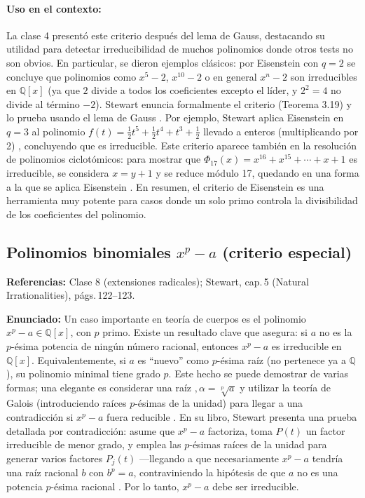\documentclass[12pt, letter]{article}
\begin{document}
\paragraph*{Uso en el contexto:}
La clase 4 presentó este criterio después del lema de Gauss, destacando su utilidad para detectar irreducibilidad de muchos polinomios donde otros tests no son obvios. En particular, se dieron ejemplos clásicos: por Eisenstein con $q=2$ se concluye que polinomios como $x^5 - 2$, $x^{10}-2$ o en general $x^n - 2$ son irreducibles en $\mathbb{Q}[x]$ (ya que $2$ divide a todos los coeficientes excepto el líder, y $2^2=4$ no divide al término $-2$). Stewart enuncia formalmente el criterio (Teorema 3.19) y lo prueba usando el lema de Gauss  . Por ejemplo, Stewart aplica Eisenstein en $q=3$ al polinomio $f(t)=\tfrac{1}{2}t^5+\tfrac{1}{2}t^4+t^3+\tfrac{1}{2}$ llevado a enteros (multiplicando por 2) , concluyendo que es irreducible. Este criterio aparece también en la resolución de polinomios ciclotómicos: para mostrar que $\Phi_{17}(x)=x^{16}+x^{15}+\cdots+x+1$ es irreducible, se considera $x= y+1$ y se reduce módulo 17, quedando en una forma a la que se aplica Eisenstein  . En resumen, el criterio de Eisenstein es una herramienta muy potente para casos donde un solo primo controla la divisibilidad de los coeficientes del polinomio.

\subsection*{Polinomios binomiales $x^p - a$ (criterio especial)}

\textbf{Referencias:} Clase 8 (extensiones radicales); Stewart, cap.\,5 (Natural Irrationalities), págs.\,122–123.

\textbf{Enunciado:}  
Un caso importante en teoría de cuerpos es el polinomio $x^p - a \in \mathbb{Q}[x]$, con $p$ primo. Existe un resultado clave que asegura: si $a$ no es la $p$-ésima potencia de ningún número racional, entonces $x^p - a$ es irreducible en $\mathbb{Q}[x]$. Equivalentemente, si $a$ es “nuevo” como $p$-ésima raíz (no pertenece ya a $\mathbb{Q}$), su polinomio minimal tiene grado $p$. Este hecho se puede demostrar de varias formas; una elegante es considerar una raíz $,\alpha=\sqrt[p]{a}$ y utilizar la teoría de Galois (introduciendo raíces $p$-ésimas de la unidad) para llegar a una contradicción si $x^p-a$ fuera reducible . En su libro, Stewart presenta una prueba detallada por contradicción: asume que $x^p - a$ factoriza, toma $P(t)$ un factor irreducible de menor grado, y emplea las $p$-ésimas raíces de la unidad para generar varios factores $P_j(t)$ —llegando a que necesariamente $x^p - a$ tendría una raíz racional $b$ con $b^p=a$, contraviniendo la hipótesis de que $a$ no es una potencia $p$-ésima racional . Por lo tanto, $x^p - a$ debe ser irreducible.
\end{document}
